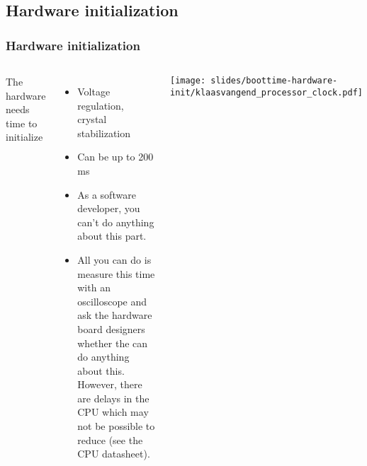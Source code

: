 \subsection{Hardware initialization}

\begin{frame}
\frametitle{Hardware initialization}
\begin{columns}
The hardware needs time to initialize
\begin{itemize}
\item Voltage regulation, crystal stabilization
\item Can be up to 200 ms
\item As a software developer, you can't do anything about this part.
\item All you can do is measure this time with an oscilloscope and
      ask the hardware board designers whether the can do anything about
      this. However, there are delays in the CPU which may not be
      possible to reduce (see the CPU datasheet).  
\end{itemize}
\texttt{[image: slides/boottime-hardware-init/klaasvangend\_processor\_clock.pdf]}
\end{columns}
\end{frame}

